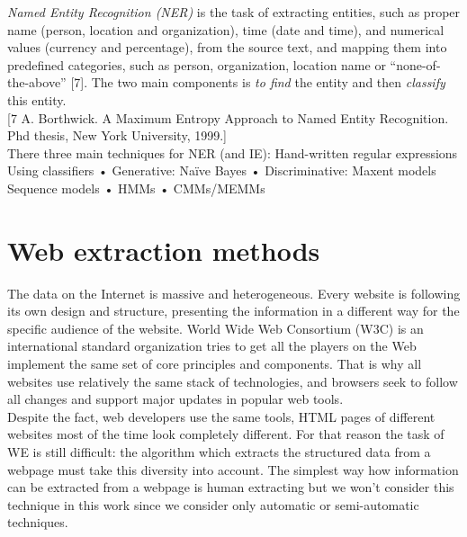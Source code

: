 \textit{Named Entity Recognition (NER)} is the task of extracting entities, such as proper name (person, location and organization), time (date and time), and numerical values (currency and percentage), from the source text, and mapping them into predefined categories, such as person, organization, location name or “none-of-the-above” [7]. The two main components is \textit{to find} the entity and then \textit{classify} this entity. \\

[7 A. Borthwick. A Maximum Entropy Approach to Named Entity Recognition. Phd thesis, New York University, 1999.]\\

There three main techniques for NER (and IE): 
\te
Hand-written regular expressions\\
Using classifiers
• Generative: Naïve Bayes
• Discriminative: Maxent models\\
Sequence models
• HMMs
• CMMs/MEMMs\\


\section{Web extraction methods}


The data on the Internet is massive and heterogeneous. Every website is following its own design and structure, presenting the information in a different way for the specific audience of the website. World Wide Web Consortium (W3C) is an international standard organization tries to get all the players on the Web implement the same set of core principles and components. That is why all websites use relatively the same stack of technologies, and browsers seek to follow all changes and support major updates in popular web tools.\\

Despite the fact, web developers use the same tools, HTML pages of different websites most of the time look completely different. For that reason the task of WE is still difficult: the algorithm which extracts the structured data from a webpage must take this diversity into account. The simplest way how information can be extracted from a webpage is human extracting but we won't consider this technique in this work since we consider only automatic or semi-automatic techniques. 

